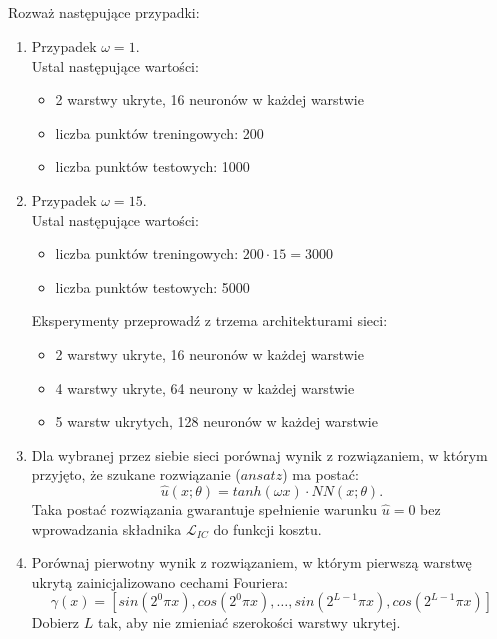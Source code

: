 \documentclass[11pt, leqno]{scrartcl}
\begin{document}
    \subsection*{}
    Rozważ następujące przypadki:
    \begin{enumerate}
        \item Przypadek $\omega=1$. \\
            Ustal następujące wartości:
            \begin{itemize}[label=--]
                \item 2 warstwy ukryte, 16 neuronów w każdej
                    warstwie
                \item liczba punktów treningowych: 200
                \item liczba punktów testowych: 1000
            \end{itemize}
        \item Przypadek $\omega=15$. \\
            Ustal następujące wartości:
            \begin{itemize}[label=--]
                \item liczba punktów treningowych:
                    $200 \cdot 15=3000$
                \item liczba punktów testowych: 5000
            \end{itemize}
            Eksperymenty przeprowadź z trzema architekturami
            sieci:
            \begin{itemize}[label=--]
                \item 2 warstwy ukryte, 16 neuronów w każdej
                    warstwie
                \item 4 warstwy ukryte, 64 neurony w każdej
                    warstwie
                \item 5 warstw ukrytych, 128 neuronów w każdej
                    warstwie
            \end{itemize}
        \item Dla wybranej przez siebie sieci porównaj wynik
            z rozwiązaniem, w którym przyjęto, że szukane
            rozwiązanie ($ansatz$) ma postać:
            \[
                \hat{u}(x;\theta)=tanh(\omega x) \cdot
                    NN(x;\theta).
            \]
            Taka postać rozwiązania gwarantuje spełnienie warunku
            $\hat{u}=0$ bez wprowadzania składnika
            $\mathcal{L}_{IC}$ do funkcji kosztu.
        \item Porównaj pierwotny wynik z rozwiązaniem, w którym
        pierwszą warstwę ukrytą zainicjalizowano cechami Fouriera:
        \[
            \gamma (x)=[sin(2^0\pi x),cos(2^0\pi x),\dots,
                sin(2^{L-1}\pi x),cos(2^{L-1}\pi x)]
        \]
        Dobierz $L$ tak, aby nie zmieniać szerokości warstwy
        ukrytej.
    \end{enumerate}
\end{document}
